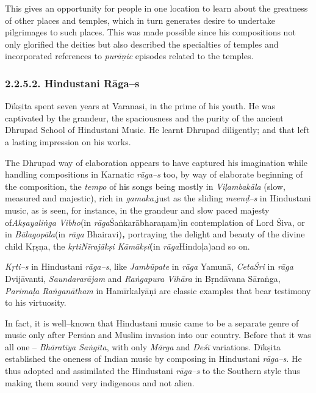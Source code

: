 This gives an opportunity for people in one location to learn about the greatness of other places and temples, which in turn generates desire to undertake pilgrimages to such places. This was made possible since his compositions not only glorified the deities but also described the specialties of temples and incorporated references to \textit{purāṇic} episodes related to the temples.

\vspace{-.3cm}

\subsubsection*{2.2.5.2. Hindustani Rāga–s}

Dīkṣita spent seven years at Varanasi, in the prime of his youth. He was captivated by the grandeur, the spaciousness and the purity of the ancient Dhrupad School of Hindustani Music. He learnt Dhrupad diligently; and that left a lasting impression on his works.

The Dhrupad way of elaboration appears to have captured his imagination while handling compositions in Karnatic \textit{rāga–s} too, by way of elaborate beginning of the composition, the \textit{tempo} of his songs being mostly in \textit{Viḷambakāla} (slow, measured and majestic), rich in \textit{gamaka,}just as the sliding \textit{meenḍ–s} in Hindustani music, as is seen, for instance, in the grandeur and slow paced majesty of\textit{Akṣayaliṅga Vibho}(in \textit{rāga}Śaṅkarābharaṇam)in contemplation of Lord Śiva, or in \textit{Bālagopāla}(in \textit{rāga} Bhairavi)\textit{\textbf{, }}portraying the delight and beauty of the divine child Kṛṣṇa, the \textit{kṛtiNīrajākṣi Kāmākṣi}\textbf{(}in \textit{rāga}Hindoḷa)and so on.

\textit{Kṛti–s} in Hindustani \textit{rāga–s}, like \textit{Jambūpate} in \textit{rāga} Yamunā, \textit{CetaŚri} in \textit{rāga} Dvijāvanti, \textit{Saundararājam} and \textit{Raṅgapura Vihāra} in Bṛndāvana Sāraṅga, \textit{Parimaḷa Raṅganātham} in Hamīrkalyāṇi are classic examples that bear testimony to his virtuosity.

In fact, it is well–known that Hindustani music came to be a separate genre of music only after Persian and Muslim invasion into our country. Before that it was all one – \textit{Bhāratīya Saṅgīta}, with only \textit{Mārga} and \textit{Deśī} variations. Dīkṣita established the oneness of Indian music by composing in Hindustani \textit{rāga–s}. He thus adopted and assimilated the Hindustani \textit{rāga–s} to the Southern style thus making them sound very indigenous and not alien.


